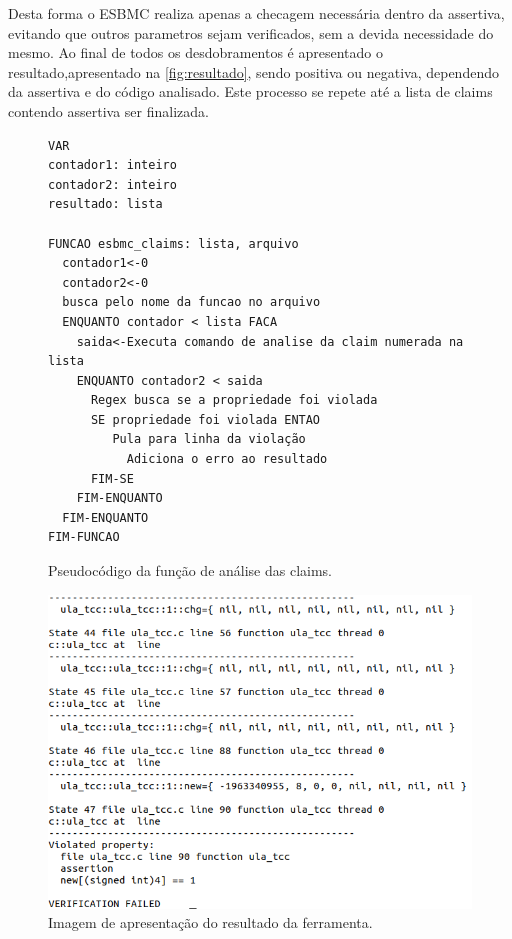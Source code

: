 \par
Desta forma o ESBMC realiza apenas a checagem necessária dentro da assertiva, evitando que outros parametros sejam verificados, sem a devida necessidade do mesmo. Ao final de todos os desdobramentos é apresentado o resultado,apresentado na \autoref{fig:resultado}, sendo positiva ou negativa, dependendo da assertiva e do código analisado. Este processo se repete até a lista de claims contendo assertiva ser finalizada.
\begin{figure}[H]
\caption{\label{fig:analise_claims}Pseudocódigo da função de análise das claims.}
	\begin{center}
    \begin{minipage}{0.7\textwidth}
    \begin{lstlisting}       
VAR
contador1: inteiro
contador2: inteiro
resultado: lista

FUNCAO esbmc_claims: lista, arquivo
  contador1<-0
  contador2<-0
  busca pelo nome da funcao no arquivo
  ENQUANTO contador < lista FACA
    saida<-Executa comando de analise da claim numerada na lista
    ENQUANTO contador2 < saida
      Regex busca se a propriedade foi violada
      SE propriedade foi violada ENTAO
         Pula para linha da violação
	       Adiciona o erro ao resultado       
      FIM-SE  
    FIM-ENQUANTO
  FIM-ENQUANTO
FIM-FUNCAO
    \end{lstlisting}
    \end{minipage}
	\end{center}
\end{figure}

\begin{figure}[H]
	\begin{center}
    \caption{\label{fig:resultado}Imagem de apresentação do resultado da ferramenta.}
	\includegraphics[scale=0.6]{Figuras/erro_assert.png}
	\end{center}
\end{figure}